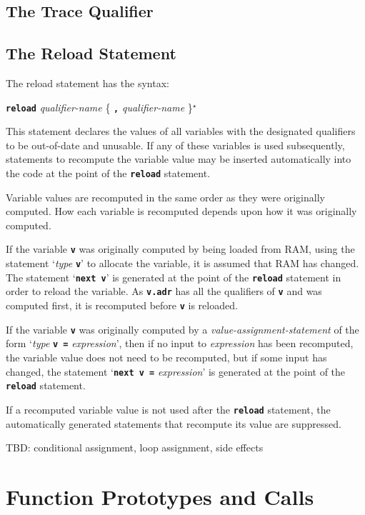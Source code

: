 \documentclass[12pt]{article}
\makeatletter
\newcommand{\TT}[1]{{\tt \bfseries #1}}
\newcommand{\ttkey}[1]{\TT{#1}\index{#1@{\tt #1}}}
\newcommand{\STAR}{{\Large $^\star$}}
\makeatother
\begin{document}
\subsection{The Trace Qualifier}
\label{THE-TRACE-QUALIFIER}

\subsection{The Reload Statement}
\label{THE-RELOAD-COMMAND}

The reload statement has the syntax:
\begin{center}
\ttkey{reload} {\em qualifier-name} \{ \TT{,} {\em qualifier-name} \}\STAR{}
\end{center}

This statement declares the values of all variables with the designated
qualifiers to be out-of-date and unusable.  If any of these variables
is used subsequently, statements to recompute the variable value
may be inserted automatically into the code at the point of the
\TT{reload} statement.

Variable values are recomputed in the same order as they were
originally computed.  How each variable is recomputed depends upon
how it was originally computed.

If the variable \TT{v} was originally computed by being loaded from
RAM, using the statement `{\em type} \TT{v}' to allocate the variable,
it is assumed that RAM has changed.  The statement `\TT{next v}' is
generated at the point of the \TT{reload} statement in order
to reload the variable.  As \TT{v.adr}
has all the qualifiers of \TT{v} and was 
computed first, it is recomputed before \TT{v} is reloaded.

If the variable \TT{v} was originally computed by
a {\em value-assignment-statement}
of the form `{\em type} \TT{v =} {\em expression}', then if
no input to {\em expression} has been recomputed, the variable value does not
need to be recomputed, but if some input has changed, the
statement `\TT{next v =} {\em expression}' is generated at the
point of the \TT{reload} statement.

If a recomputed variable value is not used after the \TT{reload} statement,
the automatically generated
statements that recompute its value are suppressed.

TBD: conditional assignment, loop assignment, side effects

\section{Function Prototypes and Calls}
\label{FUNCTION-PROTOTYPES-AND-CALLS}
\end{document}

